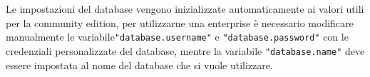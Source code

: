 Le impostazioni del database vengono inizializzate automaticamente ai valori utili per la community edition, per utilizzarne una enterprise è necessario modificare manualmente le variabile\texttt{"database.username"} e \texttt{"database.password"} con le credenziali personalizzate del database, mentre la variabile \texttt{"database.name"} deve essere impostata al nome del database che si vuole utilizzare.